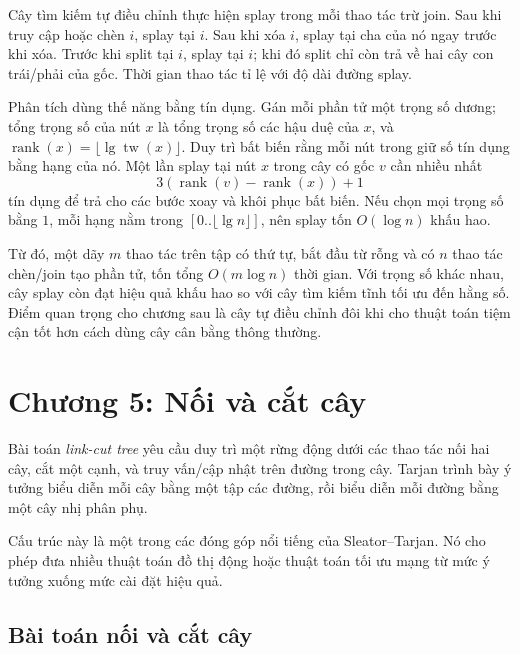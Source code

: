 \documentclass[11pt]{article}
\begin{document}
Cây tìm kiếm tự điều chỉnh thực hiện splay trong mỗi thao tác trừ join. Sau khi
truy cập hoặc chèn \(i\), splay tại \(i\). Sau khi xóa \(i\), splay tại cha của
nó ngay trước khi xóa. Trước khi split tại \(i\), splay tại \(i\); khi đó split
chỉ còn trả về hai cây con trái/phải của gốc. Thời gian thao tác tỉ lệ với độ
dài đường splay.

Phân tích dùng thế năng bằng tín dụng. Gán mỗi phần tử một trọng số dương; tổng
trọng số của nút \(x\) là tổng trọng số các hậu duệ của \(x\), và
\(\operatorname{rank}(x)=\lfloor\lg \operatorname{tw}(x)\rfloor\). Duy trì bất
biến rằng mỗi nút trong giữ số tín dụng bằng hạng của nó. Một lần splay tại nút
\(x\) trong cây có gốc \(v\) cần nhiều nhất
\[
  3(\operatorname{rank}(v)-\operatorname{rank}(x))+1
\]
tín dụng để trả cho các bước xoay và khôi phục bất biến. Nếu chọn mọi trọng số
bằng \(1\), mỗi hạng nằm trong \([0..\lfloor\lg n\rfloor]\), nên splay tốn
\(O(\log n)\) khấu hao.

Từ đó, một dãy \(m\) thao tác trên tập có thứ tự, bắt đầu từ rỗng và có \(n\)
thao tác chèn/join tạo phần tử, tốn tổng \(O(m\log n)\) thời gian. Với trọng số
khác nhau, cây splay còn đạt hiệu quả khấu hao so với cây tìm kiếm tĩnh tối ưu
đến hằng số. Điểm quan trọng cho chương sau là cây tự điều chỉnh đôi khi cho
thuật toán tiệm cận tốt hơn cách dùng cây cân bằng thông thường.

\section{Chương 5: Nối và cắt cây}

Bài toán \emph{link-cut tree} yêu cầu duy trì một rừng động dưới các thao tác
nối hai cây, cắt một cạnh, và truy vấn/cập nhật trên đường trong cây. Tarjan
trình bày ý tưởng biểu diễn mỗi cây bằng một tập các đường, rồi biểu diễn mỗi
đường bằng một cây nhị phân phụ.

Cấu trúc này là một trong các đóng góp nổi tiếng của Sleator--Tarjan. Nó cho
phép đưa nhiều thuật toán đồ thị động hoặc thuật toán tối ưu mạng từ mức ý
tưởng xuống mức cài đặt hiệu quả.

\subsection*{Bài toán nối và cắt cây}
\end{document}
